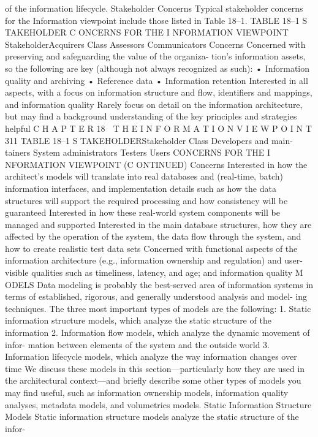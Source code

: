 of the information lifecycle.
Stakeholder Concerns
Typical stakeholder concerns for the Information viewpoint include those
listed in Table 18–1.
TABLE 18–1 S TAKEHOLDER C ONCERNS FOR THE I NFORMATION VIEWPOINT
StakeholderAcquirers
Class
Assessors
Communicators
Concerns
Concerned with preserving and safeguarding the value of the organiza-
tion’s information assets, so the following are key (although not always
recognized as such):
• Information quality and archiving
• Reference data
• Information retention
Interested in all aspects, with a focus on information structure and flow,
identifiers and mappings, and information quality
Rarely focus on detail on the information architecture, but may find a
background understanding of the key principles and strategies helpful
C H A P T E R 18  T H E I N F O R M A T I O N V I E W P O I N T
 311
TABLE 18–1 S TAKEHOLDERStakeholder Class
Developers and main-
tainers
System administrators
Testers
Users
CONCERNS FOR THE I NFORMATION VIEWPOINT (C ONTINUED)
Concerns
Interested in how the architect’s models will translate into real databases
and (real-time, batch) information interfaces, and implementation details
such as how the data structures will support the required processing and
how consistency will be guaranteed
Interested in how these real-world system components will be managed
and supported
Interested in the main database structures, how they are affected by the
operation of the system, the data flow through the system, and how to
create realistic test data sets
Concerned with functional aspects of the information architecture (e.g.,
information ownership and regulation) and user-visible qualities such
as timeliness, latency, and age; and information quality
M ODELS
Data modeling is probably the best-served area of information systems in
terms of established, rigorous, and generally understood analysis and model-
ing techniques. The three most important types of models are the following:
1. Static information structure models, which analyze the static structure of
the information
2. Information flow models, which analyze the dynamic movement of infor-
mation between elements of the system and the outside world
3. Information lifecycle models, which analyze the way information changes
over time
We discuss these models in this section—particularly how they are used in
the architectural context—and briefly describe some other types of models
you may find useful, such as information ownership models, information
quality analyses, metadata models, and volumetrics models.
Static Information Structure Models
Static information structure models analyze the static structure of the infor-
